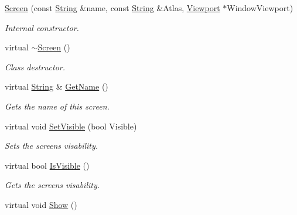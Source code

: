 \begin{DoxyCompactItemize}
\item 
\hyperlink{classphys_1_1UI_1_1Screen_a920ce661a018a590b5cc5e2f4acf4614}{Screen} (const \hyperlink{namespacephys_aa03900411993de7fbfec4789bc1d392e}{String} \&name, const \hyperlink{namespacephys_aa03900411993de7fbfec4789bc1d392e}{String} \&Atlas, \hyperlink{classphys_1_1Viewport}{Viewport} $\ast$WindowViewport)
\begin{DoxyCompactList}\small\item\em Internal constructor. \item\end{DoxyCompactList}\item 
\hypertarget{classphys_1_1UI_1_1Screen_a9dbaf96f9a8d13b943833609a94b0aa9}{
virtual \hyperlink{classphys_1_1UI_1_1Screen_a9dbaf96f9a8d13b943833609a94b0aa9}{$\sim$Screen} ()}
\label{d8/df0/classphys_1_1UI_1_1Screen_a9dbaf96f9a8d13b943833609a94b0aa9}

\begin{DoxyCompactList}\small\item\em Class destructor. \item\end{DoxyCompactList}\item 
virtual \hyperlink{namespacephys_aa03900411993de7fbfec4789bc1d392e}{String} \& \hyperlink{classphys_1_1UI_1_1Screen_a25429da07fa8f04a3183265bd8c5d3d7}{GetName} ()
\begin{DoxyCompactList}\small\item\em Gets the name of this screen. \item\end{DoxyCompactList}\item 
virtual void \hyperlink{classphys_1_1UI_1_1Screen_a033c0c85ef325148c7f9e8969000a98b}{SetVisible} (bool Visible)
\begin{DoxyCompactList}\small\item\em Sets the screens visability. \item\end{DoxyCompactList}\item 
virtual bool \hyperlink{classphys_1_1UI_1_1Screen_a8dd7698cd4b0d8760c7af7eb835eef48}{IsVisible} ()
\begin{DoxyCompactList}\small\item\em Gets the screens visability. \item\end{DoxyCompactList}\item 
\hypertarget{classphys_1_1UI_1_1Screen_a8f8c0a690b7df72bceb36f3346395389}{
virtual void \hyperlink{classphys_1_1UI_1_1Screen_a8f8c0a690b7df72bceb36f3346395389}{Show} ()}
\label{d8/df0/classphys_1_1UI_1_1Screen_a8f8c0a690b7df72bceb36f3346395389}


\end{DoxyCompactItemize}
